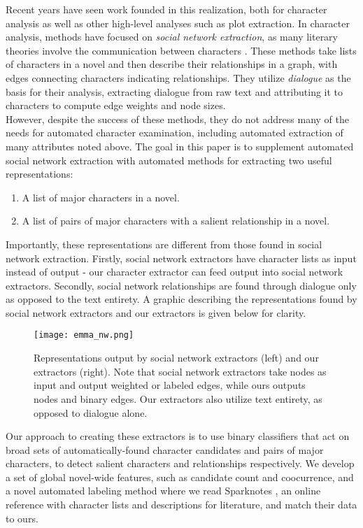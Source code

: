 \documentclass[12pt]{article}
\begin{document}
Recent years have seen work founded in this realization, both for character analysis as well as other high-level analyses such as plot extraction. In character analysis, methods have focused on \emph{social network extraction}, as many literary theories involve the communication between characters \cite{moretti1999atlas, bakhtin1937forms, williams1975country}. These methods take lists of characters in a novel and then describe their relationships in a graph, with edges connecting characters indicating relationships. They utilize \emph{dialogue} as the basis for their analysis, extracting dialogue from raw text and attributing it to characters to compute edge weights and node sizes. \\

However, despite the success of these methods, they do not address many of the needs for automated character examination, including automated extraction of many attributes noted above. The goal in this paper is to supplement automated social network extraction with automated methods for extracting two useful representations:  

\begin{enumerate}
    \setlength\itemsep{0em}
    \item A list of major characters in a novel. 
    \item A list of pairs of major characters with a salient relationship in a novel. 
\end{enumerate}

Importantly, these representations are different from those found in social network extraction. Firstly, social network extractors have character lists as input instead of output - our character extractor can feed output into social network extractors. Secondly, social network relationships are found through dialogue only as opposed to the text entirety. A graphic describing the representations found by social network extractors and our extractors is given below for clarity. 

\begin{figure}[H]
    \centering
    \texttt{[image: emma\_nw.png]}
    \caption{Representations output by social network extractors (left) and our extractors (right). Note that social network extractors take nodes as input and output weighted or labeled edges, while ours outputs nodes and binary edges. Our extractors also utilize text entirety, as opposed to dialogue alone.} 
\end{figure}

Our approach to creating these extractors is to use binary classifiers that act on broad sets of automatically-found character candidates and pairs of major characters, to detect salient characters and relationships respectively. We develop a set of global novel-wide features, such as candidate count and coocurrence, and a novel automated labeling method where we read Sparknotes \cite{sparknotes}, an online reference with character lists and descriptions for literature, and match their data to ours. 
\end{document}
